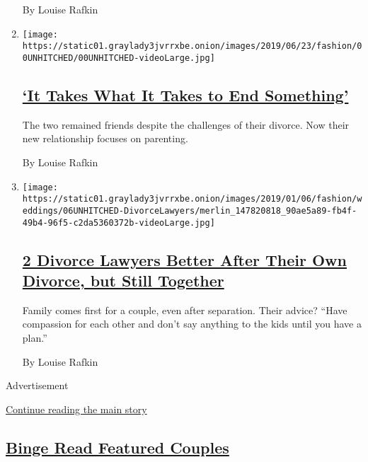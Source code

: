 \begin{enumerate}
  By Louise Rafkin
\item
  \texttt{[image: https://static01.graylady3jvrrxbe.onion/images/2019/06/23/fashion/00UNHITCHED/00UNHITCHED-videoLarge.jpg]}

  \hypertarget{it-takes-what-it-takes-to-end-something}{%
  \subsection{\texorpdfstring{\href{/2019/06/18/style/it-takes-what-it-takes-to-end-something.html}{`It
  Takes What It Takes to End
  Something'}}{`It Takes What It Takes to End Something'}}\label{it-takes-what-it-takes-to-end-something}}

  The two remained friends despite the challenges of their divorce. Now
  their new relationship focuses on parenting.

  By Louise Rafkin
\item
  \texttt{[image: https://static01.graylady3jvrrxbe.onion/images/2019/01/06/fashion/weddings/06UNHITCHED-DivorceLawyers/merlin\_147820818\_90ae5a89-fb4f-49b4-96f5-c2da5360372b-videoLarge.jpg]}

  \hypertarget{2-divorce-lawyers-better-after-their-own-divorce-but-still-together}{%
  \subsection{\texorpdfstring{\href{/2019/01/03/fashion/weddings/2-divorce-lawyers-better-after-their-own-divorce-but-still-together.html}{2
  Divorce Lawyers Better After Their Own Divorce, but Still
  Together}}{2 Divorce Lawyers Better After Their Own Divorce, but Still Together}}\label{2-divorce-lawyers-better-after-their-own-divorce-but-still-together}}

  Family comes first for a couple, even after separation. Their advice?
  ``Have compassion for each other and don't say anything to the kids
  until you have a plan.''

  By Louise Rafkin
\end{enumerate}

Advertisement

\protect\hyperlink{after-mid4}{Continue reading the main story}

\hypertarget{binge-read-featured-couples}{%
\subsection{\texorpdfstring{\href{/spotlight/wedding-announcements}{Binge
Read Featured
Couples}}{Binge Read Featured Couples}}\label{binge-read-featured-couples}}

